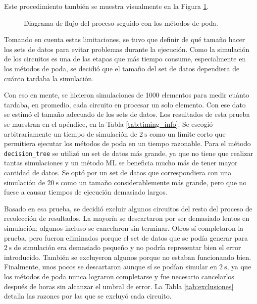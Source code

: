 Este procedimiento también se muestra visualmente en la Figura
\ref{fig:flow_poda}.

\begin{figure}[htb]
  \begin{center}
    
  \end{center}
  \caption{Diagrama de flujo del proceso seguido con los métodos de poda.}
  \label{fig:flow_poda}
\end{figure}

Tomando en cuenta estas limitaciones, se tuvo que definir de qué tamaño hacer
los sets de datos para evitar problemas durante la ejecución. Como la
simulación de los circuitos es una de las etapas que más tiempo consume,
especialmente en los métodos de poda, se decidió que el tamaño del set de datos
dependiera de cuánto tardaba la simulación.

Con eso en mente, se hicieron simulaciones de \num{1000} elementos para medir
cuánto tardaba, en promedio, cada circuito en procesar un solo elemento. Con
ese dato se estimó el tamaño adecuado de los sets de datos. Los resultados de
esta prueba se muestran en el apéndice, en la Tabla \ref{tab:timing_info}. Se
escogió arbitrariamente un tiempo de simulación de $\SI{2}{\second}$ como un
límite corto que permitiera ejecutar los métodos de poda en un tiempo razonable.
Para el método \texttt{decision\_tree} se utilizó un set de datos más grande,
ya que no tiene que realizar tantas simulaciones y un método ML se beneficia
mucho más de tener mayor cantidad de datos. Se optó por un set de datos que
correspondiera con una simulación de $\SI{20}{\second}$ como un tamaño
considerablemente más grande, pero que no fuese a causar tiempos de ejecución
demasiado largos.

Basado en esa prueba, se decidió excluir algunos circuitos del resto del
proceso de recolección de resultados. La mayoría se descartaron por ser
demasiado lentos en simulación; algunos incluso se cancelaron sin terminar.
Otros sí completaron la prueba, pero fueron eliminados porque el set de datos
que se podía generar para $\SI{2}{\second}$ de simulación era demasiado pequeño
y no podría representar bien el error introducido. También se excluyeron algunos
porque no estaban funcionando bien. Finalmente, unos pocos se descartaron
aunque sí se podían simular en $\SI{2}{\second}$, ya que los métodos de poda
nunca lograron completarse y fue necesario cancelarlos después de horas sin
alcanzar el umbral de error. La Tabla \ref{tab:exclusiones} detalla las razones
por las que se excluyó cada circuito.

